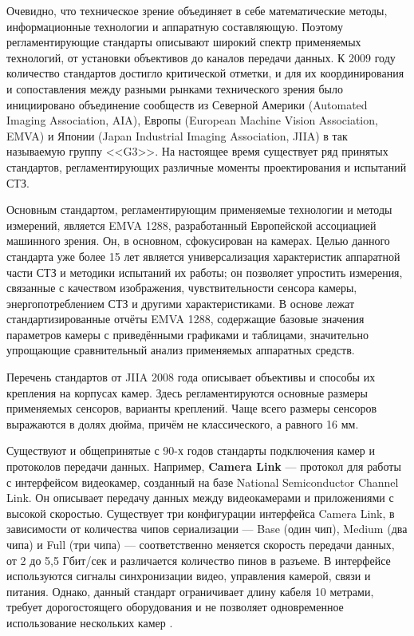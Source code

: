 Очевидно, что техническое зрение объединяет в себе математические методы, информационные технологии и аппаратную составляющую. Поэтому регламентирующие стандарты описывают широкий спектр применяемых технологий, от установки объективов до каналов передачи данных. К 2009 году количество стандартов достигло критической отметки, и для их координирования и сопоставления между разными рынками технического зрения было инициировано объединение сообществ из Северной Америки (Automated Imaging Association, AIA), Европы (European Machine Vision Association, EMVA) и Японии (Japan Industrial Imaging Association, JIIA) в так называемую группу <<G3>>. На настоящее время существует ряд принятых стандартов, регламентирующих различные моменты проектирования и испытаний СТЗ.

Основным стандартом, регламентирующим применяемые технологии и методы измерений, является EMVA 1288, разработанный Европейской ассоциацией машинного зрения. Он, в основном, сфокусирован на камерах. Целью данного стандарта уже более 15 лет является универсализация характеристик аппаратной части СТЗ и методики испытаний их работы; он позволяет упростить измерения, связанные с качеством изображения, чувствительности сенсора камеры, энергопотреблением СТЗ и другими характеристиками. В основе лежат стандартизированные отчёты EMVA 1288, содержащие базовые значения параметров камеры с приведёнными графиками и таблицами, значительно упрощающие сравнительный анализ применяемых аппаратных средств.

Перечень стандартов от JIIA 2008 года описывает объективы и способы их крепления на корпусах камер. Здесь регламентируются основные размеры применяемых сенсоров, варианты креплений. Чаще всего размеры сенсоров выражаются в долях дюйма, причём не классического, а равного 16 мм. 

Существуют и общепринятые с 90-х годов стандарты подключения камер и протоколов передачи данных. Например, \textbf{Camera Link} --- протокол для работы с интерфейсом видеокамер, созданный на базе National Semiconductor Channel Link. Он описывает передачу данных между видеокамерами и приложениями с высокой скоростью. Существует три конфигурации интерфейса Camera Link, в зависимости от количества чипов сериализации --- Base (один чип), Medium (два чипа) и Full (три чипа) --- соответственно меняется скорость передачи данных, от 2 до 5,5 Гбит/сек и различается количество пинов в разъеме. В интерфейсе используются сигналы синхронизации видео, управления камерой, связи и питания. Однако, данный стандарт ограничивает длину кабеля 10 метрами, требует дорогостоящего оборудования и не позволяет одновременное использование нескольких камер \cite{CameraLink}.

